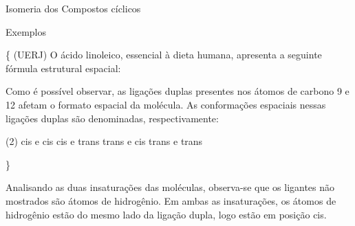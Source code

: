 \documentclass{beamer}
\begin{document}
\begin{frame}[label={sec:org61eab86}]{Isomeria dos  Compostos cíclicos}
\begin{block}{Exemplos}
\begin{question}
\scriptsize\{
(\alert{UERJ}) O ácido linoleico, essencial à dieta humana, apresenta a seguinte fórmula estrutural espacial:

\begin{center}
{\scriptsize

}
\end{center}
Como é possível observar, as ligações duplas presentes nos átomos de carbono 9 e 12 afetam o formato espacial da molécula. As conformações espaciais nessas ligações duplas são denominadas, respectivamente:

\begin{choice}(2)
\choice cis e cis
\choice cis e trans
\choice trans e cis
\choice trans e trans
\end{choice}
\}
\end{question}
\end{block}

\begin{block}{}
\begin{answer}[print=true]
\scriptsize{
Analisando as duas insaturações das moléculas, observa-se que os ligantes não mostrados são átomos de hidrogênio. Em ambas as insaturações, os átomos de hidrogênio estão do mesmo lado da ligação dupla, logo estão em posição \alert{cis}.

}
\end{answer}
\end{block}
\end{frame}
\end{document}

